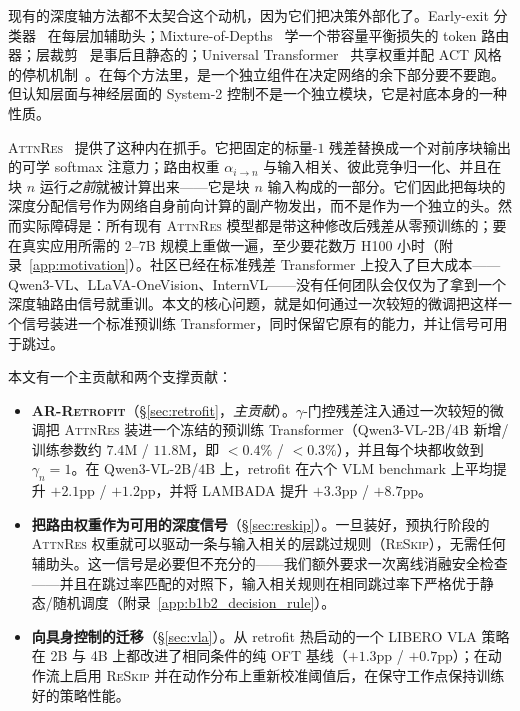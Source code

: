\documentclass{article}
\newcommand{\attnres}{\textsc{AttnRes}}
\newcommand{\reskip}{\textsc{ReSkip}}
\newcommand{\retrofit}{\textsc{AR-Retrofit}}
\begin{document}
现有的深度轴方法都不太契合这个动机，因为它们把决策外部化了。Early-exit 分类器~\citep{schuster2022confident, elbayad2020depth} 在每层加辅助头；Mixture-of-Depths~\citep{raposo2024mixture} 学一个带容量平衡损失的 token 路由器；层裁剪~\citep{gromov2024unreasonable, men2024shortgpt} 是事后且静态的；Universal Transformer~\citep{dehghani2018universal} 共享权重并配 ACT 风格的停机机制~\citep{graves2016adaptive}。在每个方法里，是一个独立组件在决定网络的余下部分要不要跑。但认知层面与神经层面的 System-2 控制不是一个独立模块，它是衬底本身的一种性质。

\attnres{}~\citep{chen2026attnres} 提供了这种内在抓手。它把固定的标量-$1$ 残差替换成一个对前序块输出的可学 softmax 注意力；路由权重 $\alpha_{i\to n}$ 与输入相关、彼此竞争归一化、并且在块 $n$ 运行\emph{之前}就被计算出来——它是块 $n$ 输入构成的一部分。它们因此把每块的深度分配信号作为网络自身前向计算的副产物发出，而不是作为一个独立的头。然而实际障碍是：所有现有 \attnres{} 模型都是带这种修改后残差从零预训练的；要在真实应用所需的 2--7B 规模上重做一遍，至少要花数万 H100 小时（附录~\ref{app:motivation}）。社区已经在标准残差 Transformer 上投入了巨大成本——Qwen3-VL、LLaVA-OneVision、InternVL——没有任何团队会仅仅为了拿到一个深度轴路由信号就重训。本文的核心问题，就是如何通过一次较短的微调把这样一个信号装进一个标准预训练 Transformer，同时保留它原有的能力，并让信号可用于跳过。

本文有一个主贡献和两个支撑贡献：
\begin{itemize}
\item \textbf{\retrofit{}}（\S\ref{sec:retrofit}，\emph{主贡献}）。$\gamma$-门控残差注入通过一次较短的微调把 \attnres{} 装进一个冻结的预训练 Transformer（Qwen3-VL-$2$B/$4$B 新增/训练参数约 $7.4$M / $11.8$M，即 $<0.4\%$ / $<0.3\%$），并且每个块都收敛到 $\gamma_n{=}1$。在 Qwen3-VL-$2$B/$4$B 上，retrofit 在六个 VLM benchmark 上平均提升 $+2.1$pp / $+1.2$pp，并将 LAMBADA 提升 $+3.3$pp / $+8.7$pp。
\item \textbf{把路由权重作为可用的深度信号}（\S\ref{sec:reskip}）。一旦装好，预执行阶段的 \attnres{} 权重就可以驱动一条与输入相关的层跳过规则（\reskip{}），无需任何辅助头。这一信号是必要但不充分的——我们额外要求一次离线消融安全检查——并且在跳过率匹配的对照下，输入相关规则在相同跳过率下严格优于静态/随机调度（附录~\ref{app:b1b2_decision_rule}）。
\item \textbf{向具身控制的迁移}（\S\ref{sec:vla}）。从 retrofit 热启动的一个 LIBERO VLA 策略在 2B 与 4B 上都改进了相同条件的纯 OFT 基线（$+1.3$pp / $+0.7$pp）；在动作流上启用 \reskip{} 并在动作分布上重新校准阈值后，在保守工作点保持训练好的策略性能。
\end{itemize}
\end{document}
